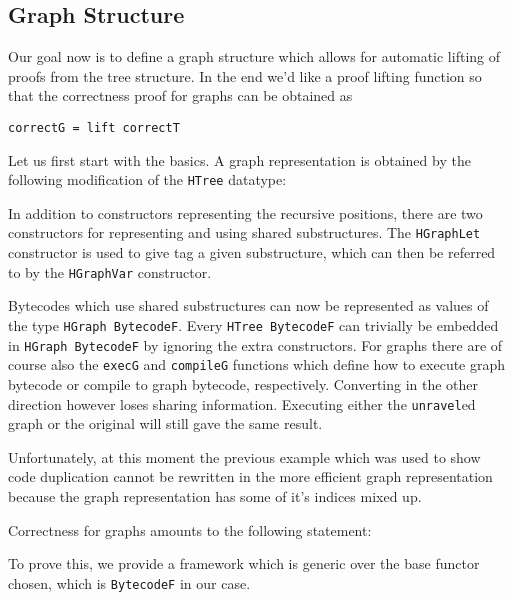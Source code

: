 \documentclass[a4paper]{article}
\begin{document}
        \subsection{Graph Structure}
        
        Our goal now is to define a graph structure which allows for automatic lifting of proofs from the tree structure. In the end we'd like a proof lifting
        function so that the correctness proof for graphs can be obtained as
        \begin{verbatim}
correctG = lift correctT
        \end{verbatim}
        
        Let us first start with the basics. A graph representation is obtained by the following modification of the \texttt{HTree} datatype:
        
        
        In addition to constructors representing the recursive positions, there are two constructors for representing and using shared substructures.
        The \texttt{HGraphLet} constructor is used to give tag a given substructure, which can then be referred to by the \texttt{HGraphVar} constructor. 
        
        Bytecodes which use shared substructures can now be represented as values of the type \texttt{HGraph BytecodeF}. Every \texttt{HTree BytecodeF} 
        can trivially be embedded in \texttt{HGraph BytecodeF} by ignoring the extra constructors. For graphs there are of course also the
        \texttt{execG} and \texttt{compileG} functions which define how to execute graph bytecode or compile to graph bytecode, respectively. Converting in the other direction however loses sharing
        information. Executing either the \texttt{unravel}ed graph or the original will still gave the same result. 
        
        Unfortunately, at this moment the previous example which was used to show code duplication cannot be rewritten in the more efficient graph 
        representation because the graph representation has some of it's indices mixed up.
        
        Correctness for graphs amounts to the following statement:
        
        
        To prove this, we provide a framework which is generic over the base functor chosen, which is \texttt{BytecodeF} in our case. 
        
\end{document}
